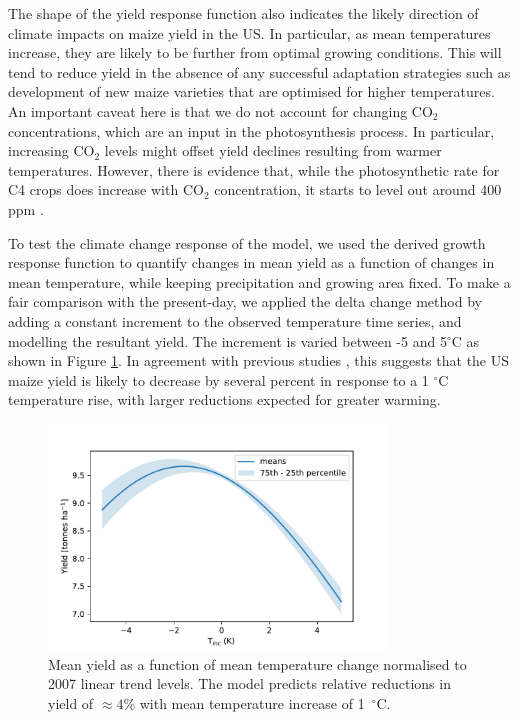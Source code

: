 \documentclass[12pt]{iopart}
\begin{document}
The shape of the yield response function also indicates the likely direction of climate impacts on maize yield in the US. In particular, as mean temperatures increase, they are likely to be further from optimal growing conditions. This will tend to reduce yield in the absence of any successful adaptation strategies such as development of new maize varieties that are optimised for higher temperatures. An important caveat here is that we do not account for changing CO$_{2}$ concentrations, which are an input in the photosynthesis process. In particular, increasing CO$_{2}$ levels might offset yield declines resulting from warmer temperatures. However, there is evidence that, while the photosynthetic rate for C4 crops does increase with CO$_{2}$ concentration, it starts to level out around 400 ppm \citep[e.g.][]{leakey:2009}.

To test the climate change response of the model, we used the derived growth response function to quantify changes in mean yield as a function of changes in mean temperature, while keeping precipitation and growing area fixed. To make a fair comparison with the present-day, we applied the delta change method by adding a constant increment to the observed temperature time series, and modelling the resultant yield. The increment is varied between -5 and 5$^\circ$C  as shown in Figure \ref{fig:yield_responses}. In agreement with previous studies \citep[e.g.][]{bassu:2014, urban:2015, lobell:2017}, this suggests that the US maize yield is likely to decrease by several percent in response to a 1 $^\circ$C temperature rise, with larger reductions expected for greater warming.

\begin{figure}
\centering
\includegraphics[width=0.8\textwidth]{./figures/temperature_impact2_m5p5}
\caption{\label{fig:yield_responses} Mean yield as a function of mean temperature change normalised to 2007 linear trend levels. The model predicts relative reductions in yield of $\approx 4$\% with mean temperature increase of 1~$^\circ$C. }
\end{figure}
\end{document}
